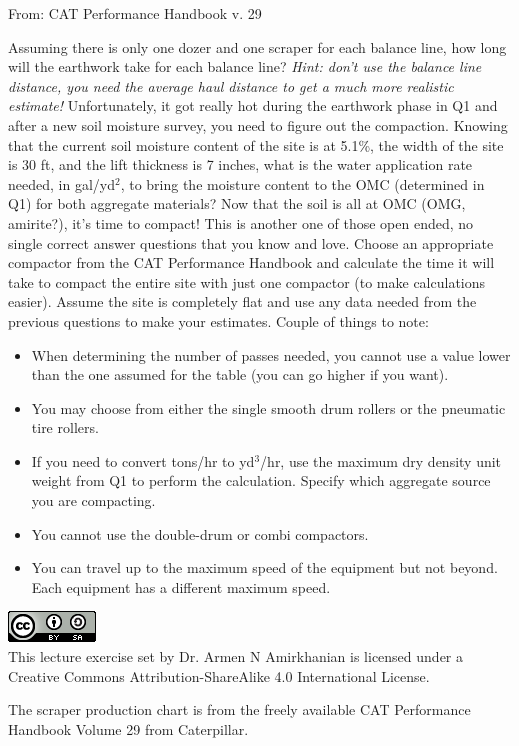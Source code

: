 \documentclass[addpoints,12pt,answers]{exam}
\begin{document}
\begin{questions}
\begin{center}
\small From: CAT Performance Handbook v. 29
\end{center}
Assuming there is only one dozer and one scraper for each balance line, how long will the earthwork take for each balance line? \textit{Hint: don't use the balance line distance, you need the average haul distance to get a much more realistic estimate!}
\question[6] Unfortunately, it got really hot during the earthwork phase in Q1 and after a new soil moisture survey, you need to figure out the compaction. Knowing that the current soil moisture content of the site is at 5.1\%, the width of the site is 30 ft, and the lift thickness is 7 inches, what is the water application rate needed, in gal/yd$^2$, to bring the moisture content to the OMC (determined in Q1) for both aggregate materials?
\newpage
\question[10] Now that the soil is all at OMC (OMG, amirite?), it's time to compact! This is another one of those open ended, no single correct answer questions that you know and love. Choose an appropriate compactor from the CAT Performance Handbook and calculate the time it will take to compact the entire site with just one compactor (to make calculations easier). Assume the site is completely flat and use any data needed from the previous questions to make your estimates. Couple of things to note:
\begin{itemize}
\item When determining the number of passes needed, you cannot use a value lower than the one assumed for the table (you can go higher if you want).
\item You may choose from either the single smooth drum rollers or the pneumatic tire rollers.
\item If you need to convert tons/hr to yd$^3$/hr, use the maximum dry density unit weight from Q1 to perform the calculation. Specify which aggregate source you are compacting.
\item You cannot use the double-drum or combi compactors.
\item You can travel up to the maximum speed of the equipment but not beyond. Each equipment has a different maximum speed.
\end{itemize}
\end{questions}

\begin{center}

\includegraphics[scale=0.6]{88x31.png}\\
This lecture exercise set by Dr. Armen N Amirkhanian is licensed under a Creative Commons Attribution-ShareAlike 4.0 International License.
\end{center}

The scraper production chart is from the freely available CAT Performance Handbook Volume 29 from Caterpillar.
\end{document}
